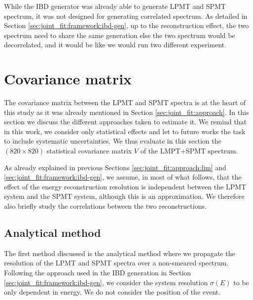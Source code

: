 \documentclass[../main.tex]{subfiles}
\begin{document}
While the IBD generator was already able to generate LPMT and SPMT spectrum, it was not designed for generating correlated spectrum. As detailed in Section \ref{sec:joint_fit:framework:ibd-gen}, up to the reconstruction effect, the two spectrum need to share the same generation else the two spectrum would be decorrelated, and it would be like we would run two different experiment.
%
%
%



\section{Covariance matrix}
\label{sec:joint_fit:cov_mat}

The covariance matrix between the LPMT and SPMT spectra is at the heart of this study as it was already mentioned in Section \ref{sec:joint_fit:approach}. In this section we discuss the different approaches taken to estimate it.
We remind that in this work, we consider only statistical effects and let to future works the task to include systematic uncertainties. We thus evaluate in this section the $(820\times820)$ statistical covariance matrix $V$ of the LMPT+SPMT spectrum.

As already explained in previous Sections \ref{sec:joint_fit:approach:lim} and \ref{sec:joint_fit:framework:ibd-gen}, we assume, in most of what follows, that the effect of the energy reconstruction resolution is independent between the LPMT system and the SPMT system, although this is an approximation. We therefore also briefly study the correlations between the two reconstructions.

\subsection{Analytical method}

The first method discussed is the analytical method where we propagate the resolution of the LPMT and SPMT spectra over a non-smeared spectrum. Following the approach used in the IBD generation in Section \ref{sec:joint_fit:framework:ibd-gen}, we consider the system resolution $\sigma(E)$ to be only dependent in energy. We do not consider the position of the event.
\end{document}
